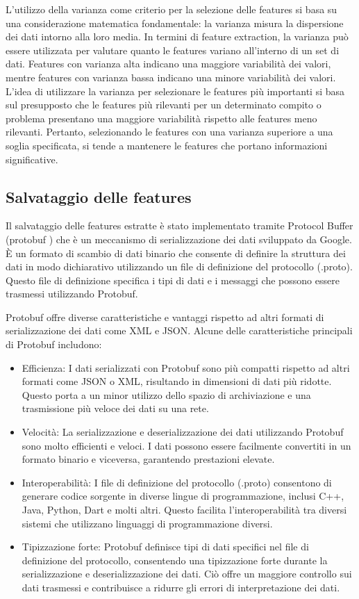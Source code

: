 \documentclass[a4paper,12pt]{report}
\begin{document}
      L'utilizzo della varianza come criterio per la selezione delle features si basa su una considerazione matematica fondamentale:
      la varianza misura la dispersione dei dati intorno alla loro media.
      In termini di feature extraction, la varianza può essere utilizzata 
      per valutare quanto le features variano all'interno di un set di dati.
      Features con varianza alta indicano una maggiore variabilità dei valori,
      mentre features con varianza bassa indicano una minore variabilità dei valori.
      L'idea di utilizzare la varianza per selezionare le features 
      più importanti si basa sul presupposto che le features più rilevanti 
      per un determinato compito o problema presentano una maggiore variabilità rispetto alle features meno rilevanti.
      Pertanto, selezionando le features con una varianza superiore a una soglia specificata, 
      si tende a mantenere le features che portano informazioni significative.
      \subsection{Salvataggio delle features}
      Il salvataggio delle features estratte è stato implementato tramite Protocol Buffer (protobuf
      ) \cite{protobuf} che è un meccanismo di serializzazione dei dati sviluppato da Google.
      È un formato di scambio di dati binario che consente di definire la struttura 
      dei dati in modo dichiarativo utilizzando un file di definizione del protocollo (.proto).
      Questo file di definizione specifica i tipi di dati e i messaggi che possono essere trasmessi utilizzando Protobuf.

      Protobuf offre diverse caratteristiche e vantaggi rispetto ad altri formati di serializzazione dei dati come XML e JSON.
      Alcune delle caratteristiche principali di Protobuf includono:
      \begin{itemize}
        \item Efficienza: I dati serializzati con Protobuf sono più compatti rispetto ad altri formati come JSON o XML, risultando in dimensioni di dati più ridotte. Questo porta a un minor utilizzo dello spazio di archiviazione e una trasmissione più veloce dei dati su una rete.
        \newpage
        \item Velocità: La serializzazione e deserializzazione dei dati utilizzando Protobuf sono molto efficienti e veloci. I dati possono essere facilmente convertiti in un formato binario e viceversa, garantendo prestazioni elevate.
        \item Interoperabilità: I file di definizione del protocollo (.proto) consentono di generare codice sorgente in diverse lingue di programmazione, inclusi C++, Java, Python, Dart e molti altri. Questo facilita l'interoperabilità tra diversi sistemi che utilizzano linguaggi di programmazione diversi.
        \item Tipizzazione forte: Protobuf definisce tipi di dati specifici nel file di definizione del protocollo, consentendo una tipizzazione forte durante la serializzazione e deserializzazione dei dati. Ciò offre un maggiore controllo sui dati trasmessi e contribuisce a ridurre gli errori di interpretazione dei dati.
      \end{itemize}
      \newpage
\end{document}
